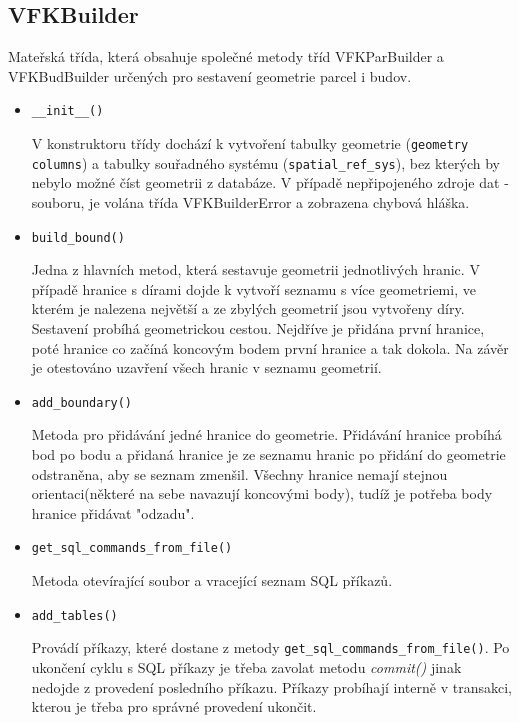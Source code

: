 \subsection{VFKBuilder}
Mateřská třída, která obsahuje společné metody tříd VFKParBuilder a VFKBudBuilder určených pro sestavení geometrie parcel i budov.
\begin{itemize}
\item \verb|__init__()|
		
V konstruktoru třídy dochází k vytvoření tabulky geometrie (\verb|geometry columns|) a tabulky souřadného systému (\verb|spatial_ref_sys|), bez kterých by nebylo možné číst geometrii z databáze. V případě nepřipojeného zdroje dat -  souboru, je volána třída VFKBuilderError a zobrazena chybová hláška.
\item \verb|build_bound()|

Jedna z hlavních metod, která sestavuje geometrii jednotlivých hranic. V případě hranice s dírami dojde k vytvoří seznamu s více geometriemi, ve kterém je nalezena největší a ze zbylých geometrií jsou vytvořeny díry. Sestavení probíhá geometrickou cestou. Nejdříve je přidána první hranice, poté hranice co začíná koncovým bodem první hranice a tak dokola. Na závěr je otestováno uzavření všech hranic v seznamu geometrií.
\item \verb|add_boundary()|

Metoda pro přidávání jedné hranice do geometrie. Přidávání hranice probíhá bod po bodu a přidaná hranice je ze seznamu hranic po přidání do geometrie odstraněna, aby se seznam zmenšil. Všechny hranice nemají stejnou orientaci(některé na sebe navazují koncovými body), tudíž je potřeba body hranice přidávat "odzadu".
\item \verb|get_sql_commands_from_file()|

Metoda otevírající soubor a vracející seznam SQL příkazů.
\item \verb|add_tables()|

Provádí příkazy, které dostane z metody \verb|get_sql_commands_from_file()|. Po ukončení cyklu s SQL příkazy je třeba zavolat metodu \textit{commit()} jinak nedojde z provedení posledního příkazu. Příkazy probíhají interně v transakci, kterou je třeba pro správné provedení ukončit.
\end{itemize}
